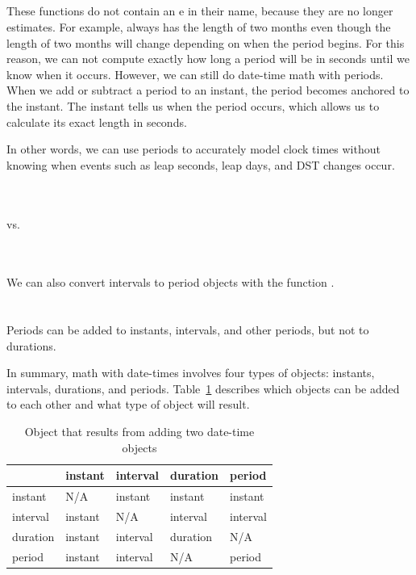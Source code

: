 \documentclass[article]{jss}
\begin{document}
\\
\\

\\
\\

These functions do not contain an e in their name, because they are no longer estimates. For example,  always has the length of two months even though the length of two months will change depending on when the period begins. For this reason, we can not compute exactly how long a period will be in seconds until we know when it occurs. However, we can still do date-time math with periods. When we add or subtract a period to an instant, the period becomes anchored to the instant. The instant tells us when the period occurs, which allows us to calculate its exact length in seconds. 

In other words, we can use periods to accurately model clock times without knowing when events such as leap seconds, leap days, and DST changes occur.

\\
\\

vs.

\\
\\

We can also convert intervals to period objects with the function .\\

\\
\\

Periods can be added to instants, intervals, and other periods, but not to durations.


In summary, math with date-times involves four types of objects: instants, intervals, durations, and periods. Table~\ref{tbl:date-math} describes which objects can be added to each other and what type of object will result.

\begin{table}
  \begin{center}
  \begin{tabular}{l|llll}
  & instant & interval & duration & period\\
  \hline
  instant & N/A & instant & instant & instant\\
  interval & instant & N/A & interval & interval\\
  duration & instant & interval & duration & N/A\\
  period & instant & interval & N/A & period\\
  \hline
    
  \end{tabular}
  \end{center}
  \caption{Object that results from adding two date-time objects}
  \label{tbl:date-math}
\end{table}
\end{document}
